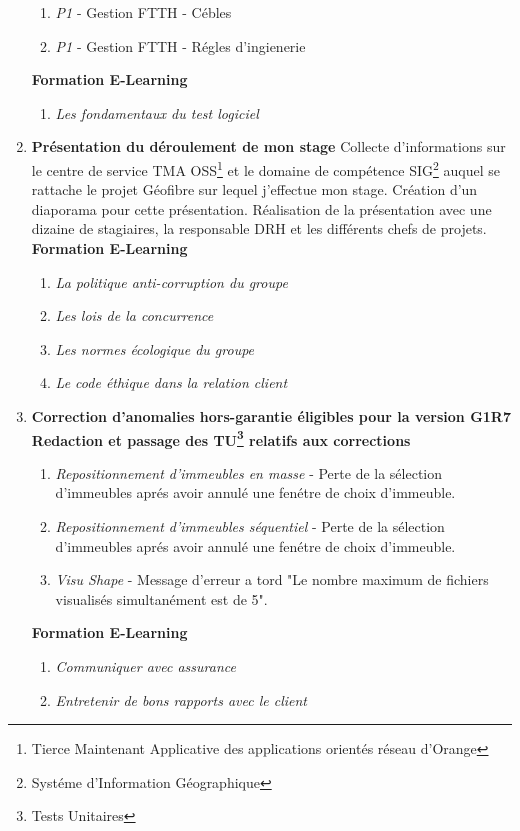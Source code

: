 \begin{enumerate}[label= Semaine \no\textbf{\arabic*.},itemsep=20pt]
\begin{enumerate}[start = 2,label = Tests \no\arabic*.,align=left]
\item  \emph{\colorbox{rouge}{P1}} - Gestion FTTH - Cébles
\item  \emph{\colorbox{rouge}{P1}} - Gestion FTTH - Régles d'ingienerie
\end{enumerate}
\textbf{Formation E-Learning}
\begin{enumerate}[label = Formation \no\arabic*.,align=left]
	\item \textit{Les fondamentaux du test logiciel}
\end{enumerate}

\newpage
\item \textbf{Présentation du déroulement de mon stage} Collecte d'informations sur le centre de service  \textsc{TMA OSS\footnote{Tierce Maintenant Applicative des applications orientés réseau d'Orange}} et le domaine de compétence \textsc{SIG\footnote{Systéme d'Information Géographique}} auquel se rattache le projet Géofibre sur lequel j'effectue mon stage. Création d'un diaporama pour cette présentation. Réalisation de la présentation avec une dizaine de stagiaires, la responsable DRH et les différents chefs de projets.
\newline
\textbf{Formation E-Learning}
\begin{enumerate}[label = Formation \no\arabic*.,align=left]
	\item \textit{La politique anti-corruption du groupe}
	\item \textit{Les lois de la concurrence}
	\item \textit{Les normes écologique du groupe}
	\item \textit{Le code éthique dans la relation client}
\end{enumerate}
\item
\textbf{Correction d'anomalies hors-garantie éligibles pour la version G1R7}
\textbf{Redaction et passage des \textsc{TU\footnote{Tests Unitaires}} relatifs aux corrections}
\begin{enumerate}[label = Correction \no\arabic*.,align=left]
	\item \textit{Repositionnement d'immeubles en masse} - Perte de la sélection d'immeubles aprés avoir annulé une fenétre de choix d'immeuble.
	\item \textit{Repositionnement d'immeubles séquentiel} - Perte de la sélection d'immeubles aprés avoir annulé une fenétre de choix d'immeuble.
	\item \textit{Visu Shape} - Message d'erreur a tord "Le nombre maximum de fichiers visualisés simultanément est de 5".
\end{enumerate}
\textbf{Formation E-Learning}
\begin{enumerate}[label = Formation \no\arabic*.,align=left]
	\item \textit{Communiquer avec assurance}
	\item \textit{Entretenir de bons rapports avec le client}
\end{enumerate}


\end{enumerate}
